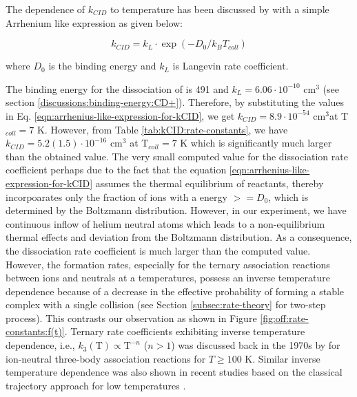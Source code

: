 The dependence of $k_{CID}$ to temperature has been discussed by \citet{SGA2015}
with a simple Arrhenium like expression as given below:

\begin{equation}
    k_{CID} = k_{L} \cdot \exp(-D_{0}/k_B T_{coll})
    \label{eqn:arrhenius-like-expression-for-kCID}
\end{equation}

where $D_0$ is the binding energy and $k_L$ is Langevin rate coefficient.

The binding energy for the dissociation of \CD is 491 \wnn and $k_L = 6.06 \cdot 10^{-10}$ cm$^3$\pers 
(see section \ref{discussions:binding-energy:CD+}). 
Therefore, by substituting the values in Eq. \ref{eqn:arrhenius-like-expression-for-kCID}, we get 
$k_{CID} = 8.9 \cdot 10^{-54}$ cm$^3$\pers at T$_{coll}=7$ K. However, from Table
\ref{tab:kCID:rate-constants}, we have $k_{CID} = 5.2(1.5) \cdot 10^{-16}$ cm$^3$\pers 
at T$_{coll}=7$ K which is significantly much larger than the obtained value.
The very small computed value for the dissociation rate coefficient perhaps due to the fact that the    
equation \ref{eqn:arrhenius-like-expression-for-kCID} assumes the thermal equilibrium
of reactants, thereby incorpoarates only the fraction
of ions with a energy $>= D_0$, which is determined by the Boltzmann distribution.  
However, in our experiment, we have continuous inflow of helium neutral atoms
which leads to a non-equilibrium thermal effects and deviation from the Boltzmann distribution.
As a consequence, the dissociation rate coefficient is much larger than the computed value.\\

However, the formation rates, especially for the ternary association reactions
between ions and neutrals at a temperatures, possess an inverse temperature
dependence because of a decrease in the effective probability of forming a
stable complex with a single collision \cite{herbst_dense_1988} (see Section
\ref{subsec:rate-theory} for two-step process). This contrasts our observation
as shown in Figure \ref{fig:off:rate-constants:f(t)}. Ternary rate coefficients exhibiting
inverse temperature dependence, i.e., $k_3 (\text{T}) \propto \text{T}^{-n}$ ($n > 1$) 
was discussed back in the 1970s by \citet{Herbst1979} for ion-neutral
three-body association reactions for $T \geq 100$ K.
Similar inverse temperature dependence was also shown in recent studies based on the classical trajectory approach for low temperatures \cite{perez-rios_communication_2015, greene_universal_2017}.

